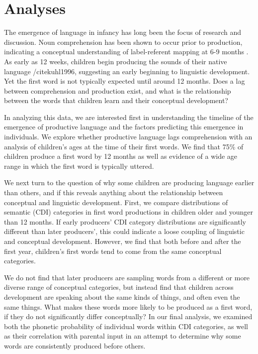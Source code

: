 \documentclass[10pt,letterpaper]{article}
\begin{document}
\section{Analyses}
The emergence of language in infancy has long been the focus of research and discussion. Noun comprehension has been shown to occur prior to production, indicating a conceptual understanding of label-referent mapping at 6-9 months \cite{tincoff1999,tincoff2012,bergelson2012}. As early as 12 weeks, children begin producing the sounds of their native language /cite{kuhl1996}, suggesting an early beginning to linguistic development. Yet the first word is not typically expected until around 12 months. Does a lag between comprehension and production exist, and what is the relationship between the words that children learn and their conceptual development? 

In analyzing this data, we are interested first in understanding the timeline of the emergence of productive language and the factors predicting this emergence in individuals. We explore whether productive language lags comprehension with an analysis of children's ages at the time of their first words. We find that 75\% of children produce a first word by 12 months as well as evidence of a wide age range in which the first word is typically uttered.

We next turn to the question of why some children are producing language earlier than others, and if this reveals anything about the relationship between conceptual and linguistic development. First, we compare distributions of semantic (CDI) categories in first word productions in children older and younger than 12 months. If early producers' CDI category distributions are significantly different than later producers', this could indicate a loose coupling of linguistic and conceptual development. However, we find that both before and after the first year, children's first words tend to come from the same conceptual categories.

We do not find that later producers are sampling words from a different or more diverse range of conceptual categories, but instead find that children across development are speaking about the same kinds of things, and often even the same things. What makes these words more likely to be produced as a first word, if they do not significantly differ conceptually? In our final analysis, we examined both the phonetic probability of individual words within CDI categories, as well as their correlation with parental input in an attempt to determine why some words are consistently produced before others. 
\end{document}
